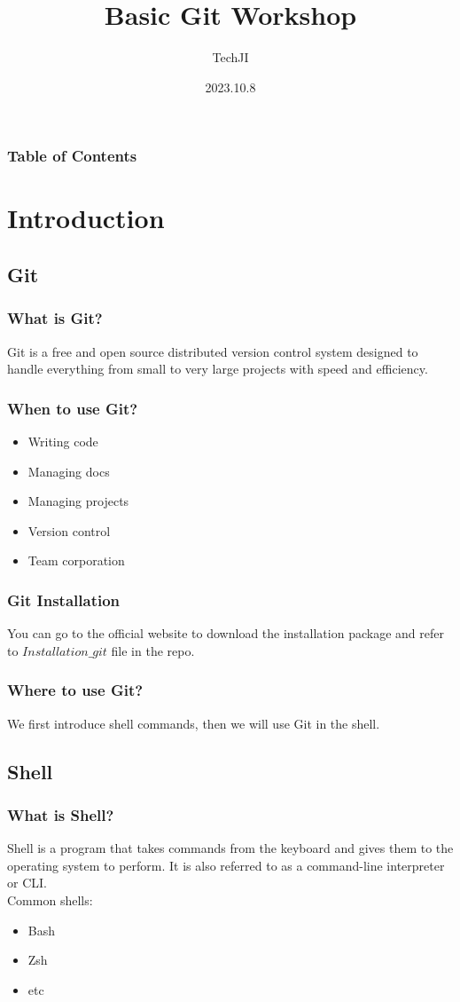\documentclass[aspectratio=169]{beamer}
\title[Course number]{Basic Git Workshop}
\author[]{TechJI}
\institute[UMJI-SJTU]
{
	University of Michigan - Shanghai Jiaotong University
	\\\medskip
	Joint Institute
}
\date{2023.10.8}
\begin{document}
\maketitle
\begin{frame}
  \frametitle{Table of Contents}
  \tableofcontents
\end{frame}

\section{Introduction}
\subsection{Git}
\begin{frame}
  \frametitle{What is Git?}
  Git is a free and open source distributed version control system designed to handle everything from small to very large projects with speed and efficiency.
\end{frame}

\begin{frame}
  \frametitle{When to use Git?}

  \begin{itemize}
    \item Writing code
    \item Managing docs
    \item Managing projects
    \item Version control
    \item Team corporation
  \end{itemize}

\end{frame}

\begin{frame}
  \frametitle{Git Installation}
  You can go to the official website to download the installation package and refer to $Installation\_git$ file in the repo.
\end{frame}

\begin{frame}
  \frametitle{Where to use Git?}
  We first introduce shell commands, then we will use Git in the shell.
\end{frame}

\subsection{Shell}
\begin{frame}
  \frametitle{What is Shell?}
  Shell is a program that takes commands from the keyboard and gives them to the operating system to perform. It is also referred to as a command-line interpreter or CLI.
  \\
  Common shells:
  \begin{itemize}
    \item Bash
    \item Zsh
    \item etc
  \end{itemize}
\end{frame}
\end{document}
